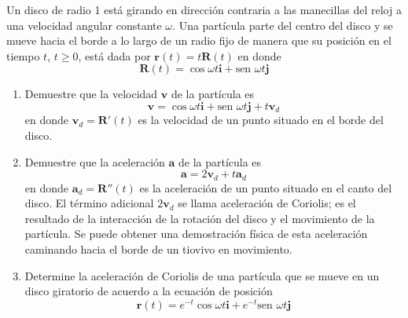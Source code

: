 \item Un disco de radio 1 está girando en dirección contraria a las manecillas del reloj a una velocidad angular constante $\omega$. Una partícula parte del centro del disco y se mueve hacia el borde a lo largo de un radio fijo de manera que su posición en el tiempo $t$, $t \ge 0$, está dada por $\mathbf{r}(t) = t\mathbf{R}(t)$ en donde
\[
\mathbf{R}(t) = \cos \omega t \mathbf{i} + \text{sen } \omega t \mathbf{j}
\]
\begin{enumerate}
    \item Demuestre que la velocidad $\mathbf{v}$ de la partícula es
    \[
    \mathbf{v} = \cos \omega t \mathbf{i} + \text{sen } \omega t \mathbf{j} + t\mathbf{v}_d
    \]
    en donde $\mathbf{v}_d = \mathbf{R}'(t)$ es la velocidad de un punto situado en el borde del disco.
    \item Demuestre que la aceleración $\mathbf{a}$ de la partícula es
    \[
    \mathbf{a} = 2\mathbf{v}_d + t\mathbf{a}_d
    \]
    en donde $\mathbf{a}_d = \mathbf{R}''(t)$ es la aceleración de un punto situado en el canto del disco. El término adicional $2\mathbf{v}_d$ se llama aceleración de Coriolis; es el resultado de la interacción de la rotación del disco y el movimiento de la partícula. Se puede obtener una demostración física de esta aceleración caminando hacia el borde de un tiovivo en movimiento.
    \item Determine la aceleración de Coriolis de una partícula que se mueve en un disco giratorio de acuerdo a la ecuación de posición
    \[
    \mathbf{r}(t) = e^{-t} \cos \omega t \mathbf{i} + e^{-t} \text{sen } \omega t \mathbf{j}
    \]
\end{enumerate}

